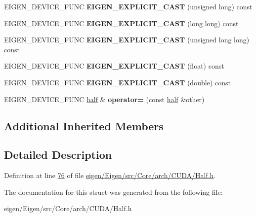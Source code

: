 \begin{DoxyCompactItemize}
\item 
\mbox{\label{struct_eigen_1_1half_a65245f589dd3bddc7fa7a4bb234bb0ab}} 
E\+I\+G\+E\+N\+\_\+\+D\+E\+V\+I\+C\+E\+\_\+\+F\+U\+NC {\bfseries E\+I\+G\+E\+N\+\_\+\+E\+X\+P\+L\+I\+C\+I\+T\+\_\+\+C\+A\+ST} (unsigned long) const
\item 
\mbox{\label{struct_eigen_1_1half_a08c6740cef4d707ba0022fc6ad943a67}} 
E\+I\+G\+E\+N\+\_\+\+D\+E\+V\+I\+C\+E\+\_\+\+F\+U\+NC {\bfseries E\+I\+G\+E\+N\+\_\+\+E\+X\+P\+L\+I\+C\+I\+T\+\_\+\+C\+A\+ST} (long long) const
\item 
\mbox{\label{struct_eigen_1_1half_a4b3950b29acf30842cb71e1b74b8f8d0}} 
E\+I\+G\+E\+N\+\_\+\+D\+E\+V\+I\+C\+E\+\_\+\+F\+U\+NC {\bfseries E\+I\+G\+E\+N\+\_\+\+E\+X\+P\+L\+I\+C\+I\+T\+\_\+\+C\+A\+ST} (unsigned long long) const
\item 
\mbox{\label{struct_eigen_1_1half_a36b0fe8c6af9c353b1c4c9578cd24227}} 
E\+I\+G\+E\+N\+\_\+\+D\+E\+V\+I\+C\+E\+\_\+\+F\+U\+NC {\bfseries E\+I\+G\+E\+N\+\_\+\+E\+X\+P\+L\+I\+C\+I\+T\+\_\+\+C\+A\+ST} (float) const
\item 
\mbox{\label{struct_eigen_1_1half_adec8bfdfe430518626453a17e1d90ca2}} 
E\+I\+G\+E\+N\+\_\+\+D\+E\+V\+I\+C\+E\+\_\+\+F\+U\+NC {\bfseries E\+I\+G\+E\+N\+\_\+\+E\+X\+P\+L\+I\+C\+I\+T\+\_\+\+C\+A\+ST} (double) const
\item 
\mbox{\label{struct_eigen_1_1half_a1bdc641b2ae9ee7cd8289b116a7c96b3}} 
E\+I\+G\+E\+N\+\_\+\+D\+E\+V\+I\+C\+E\+\_\+\+F\+U\+NC \hyperlink{struct_eigen_1_1half}{half} \& {\bfseries operator=} (const \hyperlink{struct_eigen_1_1half}{half} \&other)
\end{DoxyCompactItemize}
\subsection*{Additional Inherited Members}


\subsection{Detailed Description}


Definition at line \hyperlink{eigen_2_eigen_2src_2_core_2arch_2_c_u_d_a_2_half_8h_source_l00076}{76} of file \hyperlink{eigen_2_eigen_2src_2_core_2arch_2_c_u_d_a_2_half_8h_source}{eigen/\+Eigen/src/\+Core/arch/\+C\+U\+D\+A/\+Half.\+h}.



The documentation for this struct was generated from the following file\+:\begin{DoxyCompactItemize}
\item 
eigen/\+Eigen/src/\+Core/arch/\+C\+U\+D\+A/\+Half.\+h\end{DoxyCompactItemize}
